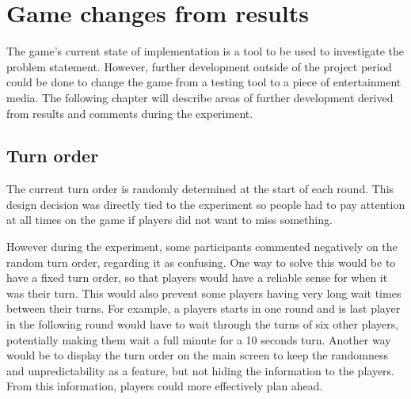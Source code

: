 \section{Game changes from results}\label{sec:changes_from_results}
The game's current state of implementation is a tool to be used to investigate the problem statement. However, further development outside of the project period could be done to change the game from a testing tool to a piece of entertainment media. The following chapter will describe areas of further development derived from results and comments during the experiment.

\subsection{Turn order}\label{sub:turn_order}
The current turn order is randomly determined at the start of each round. This design decision was directly tied to the experiment so people had to pay attention at all times on the game if players did not want to miss something.

However during the experiment, some participants commented negatively on the random turn order, regarding it as confusing. One way to solve this would be to have a fixed turn order, so that players would have a reliable sense for when it was their turn. This would also prevent some players having very long wait times between their turns. For example, a players starts in one round and is last player in the following round would have to wait through the turns of six other players, potentially making them wait a full minute for a 10 seconds turn. Another way would be to display the turn order on the main screen to keep the randomness and unpredictability as a feature, but not hiding the information to the players. From this information, players could more effectively plan ahead.